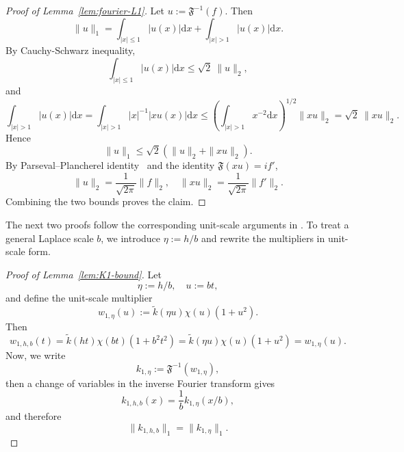 \documentclass[english, 11pt]{article}
\newcommand{\mrd}{\mathrm{d}}
\newcommand{\FT}[1]{\widetilde{#1}}
\theoremstyle{plain}
\theoremstyle{definition}
\theoremstyle{remark}
\begin{document}
\begin{appendix}
\begin{proof}[Proof of Lemma~\ref{lem:fourier-L1}]
Let $u:=\mathfrak F^{-1}(f)$. Then
\begin{equation*}
\|u\|_1 = \int_{|x|\le 1}|u(x)| \mrd x + \int_{|x|>1}|u(x)| \mrd x.
\end{equation*}
By Cauchy-Schwarz inequality,
\begin{equation*}
\int_{|x|\le 1}|u(x)| \mrd x\le \sqrt{2}\ \|u\|_2,
\end{equation*}
and
\begin{equation*}
\int_{|x|>1}|u(x)| \mrd x = \int_{|x|>1}|x|^{-1}|x u(x)| \mrd x \le \left(\int_{|x|>1}x^{-2} \mrd x\right)^{1/2}\|x u\|_2 =\sqrt{2}\ \|xu\|_2.
\end{equation*}
Hence
\begin{equation*}
\|u\|_1 \le \sqrt{2}\left(\|u\|_2+\|x u\|_2\right).
\end{equation*}
By Parseval–Plancherel identity~\citep[Theorem 9.13]{rudin1974real} and the identity $\mathfrak F(xu)= i f'$,
\begin{equation*}
\|u\|_2 = \frac{1}{\sqrt{2\pi}} \|f\|_2,\quad \|x u\|_2 = \frac{1}{\sqrt{2\pi}} \|f'\|_2.
\end{equation*}
Combining the two bounds proves the claim.
\end{proof}

The next two proofs follow the corresponding unit-scale arguments in \cite[Appendix~S1]{rousseau2024wasserstein}. 
To treat a general Laplace scale $b$, we introduce $\eta:=h/b$ and rewrite the multipliers in unit-scale form.

\restatelowfreq*

\begin{proof}[Proof of Lemma~\ref{lem:K1-bound}]
Let
\begin{equation*}
\eta:=h/b,\quad u:=bt,
\end{equation*}
and define the unit-scale multiplier
\begin{equation*}
w_{1,\eta}(u):=\FT{k}(\eta u)\chi(u)(1+u^2).
\end{equation*}
Then
\begin{equation*}
w_{1,h,b}(t) = \FT{k}(ht)\chi(bt)(1+b^2t^2) = \FT{k}(\eta u)\chi(u)(1+u^2) = w_{1,\eta}(u).
\end{equation*}
Now, we write
\begin{equation*}
k_{1,\eta}:=\mathfrak F^{-1}(w_{1,\eta}),
\end{equation*}
then a change of variables in the inverse Fourier transform gives
\begin{equation*}
k_{1,h,b}(x)=\frac{1}{b}k_{1,\eta}(x/b),
\end{equation*}
and therefore
\begin{equation*}
\|k_{1,h,b}\|_1=\|k_{1,\eta}\|_1.
\end{equation*}


\end{proof}
\end{appendix}
\end{document}
